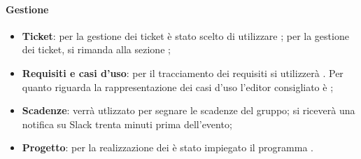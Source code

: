 	\paragraph{Gestione}
	\begin{itemize}
		\item \textbf{Ticket}: per la gestione dei ticket è stato scelto di utilizzare ; per la gestione dei ticket, si rimanda alla sezione ; %
		\item \textbf{Requisiti e casi d'uso}: per il tracciamento dei requisiti si utilizzerà . Per quanto riguarda la rappresentazione dei casi d'uso l'editor consigliato è ; %
		\item \textbf{Scadenze}:  verrà utlizzato per segnare le scadenze del gruppo; si riceverà una notifica su Slack trenta minuti prima dell'evento;
		\item \textbf{Progetto}: per la realizzazione dei  è stato impiegato il programma .
	\end{itemize}